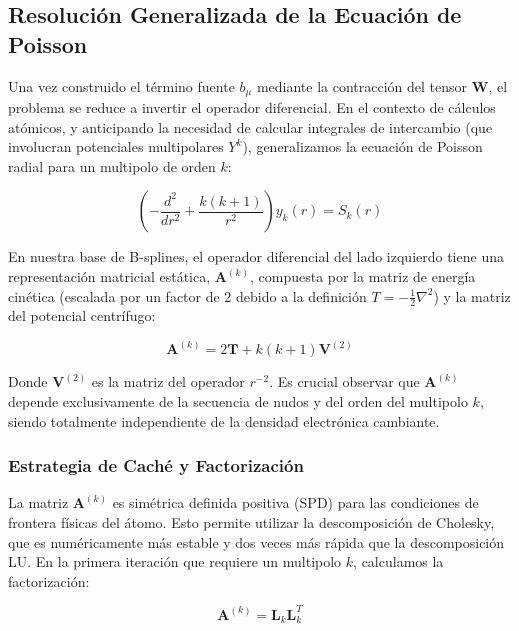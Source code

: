 \subsection{Resolución Generalizada de la Ecuación de Poisson}

Una vez construido el término fuente \( b_\mu \) mediante la contracción del tensor \( \mathbf{W} \), el problema se reduce a invertir el operador diferencial. En el contexto de cálculos atómicos, y anticipando la necesidad de calcular integrales de intercambio (que involucran potenciales multipolares \( Y^k \)), generalizamos la ecuación de Poisson radial para un multipolo de orden \( k \):

\begin{equation}
\label{eq:gen_poisson}
\left( -\frac{d^2}{dr^2} + \frac{k(k+1)}{r^2} \right) y_k(r) = S_k(r)
\end{equation}

En nuestra base de B-splines, el operador diferencial del lado izquierdo tiene una representación matricial estática, \(\mathbf{A}^{(k)}\), compuesta por la matriz de energía cinética (escalada por un factor de 2 debido a la definición \( T = -\frac{1}{2}\nabla^2 \)) y la matriz del potencial centrífugo:

\begin{equation}
\mathbf{A}^{(k)} = 2\mathbf{T} + k(k+1)\mathbf{V}^{(2)}
\end{equation}

Donde \( \mathbf{V}^{(2)} \) es la matriz del operador \( r^{-2} \). Es crucial observar que \(\mathbf{A}^{(k)}\) depende exclusivamente de la secuencia de nudos y del orden del multipolo \( k \), siendo totalmente independiente de la densidad electrónica cambiante.

\subsubsection{Estrategia de Caché y Factorización}

La matriz \(\mathbf{A}^{(k)}\) es simétrica definida positiva (SPD) para las condiciones de frontera físicas del átomo. Esto permite utilizar la descomposición de Cholesky, que es numéricamente más estable y dos veces más rápida que la descomposición LU.
En la primera iteración que requiere un multipolo \( k \), calculamos la factorización:

\begin{equation}
\mathbf{A}^{(k)} = \mathbf{L}_k \mathbf{L}_k^T
\end{equation}


